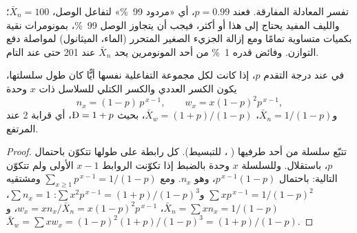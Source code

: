 تفسر المعادلة المفارقة. فعند $p = 0.99$، أي «مردود 99~\%» لتفاعل الوصل، $\bar X_n =
100$؛ والليف المفيد يحتاج إلى هذا أو أكثر، فيجب أن يتجاوز الوصل 99~\%، بمونومرات نقية
بكميات متساوية تمامًا ومع إزالة الجزيء الصغير المتحرر (الماء، الميثانول) لمواصلة دفع
التوازن. وفائض قدره 1~\% من أحد المونومرين يحد $\bar X_n$ عند 201 حتى عند  التام.

\begin{theorem}\label{thm:b2:polymer-synthesis:flory}
في  عند درجة التقدم $p$، إذا كانت لكل مجموعة التفاعلية نفسها أيًّا كان
طول سلسلتها، يكون الكسر العددي والكسر الكتلي للسلاسل ذات $x$ وحدة
\begin{equation*}
n_x = (1-p)\,p^{\,x-1}, \qquad w_x = x(1-p)^2 p^{\,x-1},
\end{equation*}
و$\bar X_n = 1/(1-p)$، $\bar X_w = (1+p)/(1-p)$، بحيث $\text{\DH} = 1 + p$، أي قرابة 2 عند
 المرتفع.
\end{theorem}

\begin{proof}
تتبّع سلسلة من أحد طرفيها ( ، للتبسيط). كل رابطة على طولها تتكوّن
باحتمال $p$، باستقلال. وللسلسلة $x$ وحدة بالضبط إذا تكوّنت الروابط $x-1$ الأولى
ولم تتكوّن التالية: باحتمال $p^{\,x-1}(1-p)$، وهو $n_x$. ومع $\sum_{x\ge1} p^{\,x-1} =
1/(1-p)$ ومشتقيه $\sum x p^{\,x-1} = 1/(1-p)^2$ و$\sum x^2 p^{\,x-1} = (1+p)/(1-p)^3$:
$\sum n_x = 1$، $\bar X_n = \sum x n_x = 1/(1-p)$، $w_x = x n_x/\bar X_n = x(1-p)^2p^{\,x-1}$، 
و$\bar X_w = \sum x w_x = (1-p)^2(1+p)/(1-p)^3 = (1+p)/(1-p)$.
\end{proof}

